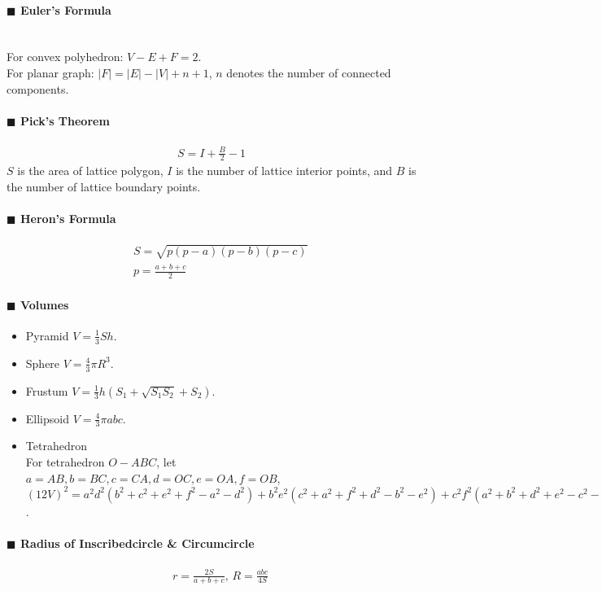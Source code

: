 \documentclass[10pt]{article}
\begin{document}
{\paragraph{$\blacksquare$ Euler's Formula}
\noindent \\
For convex polyhedron: $V-E+F=2$. \\
For planar graph: $|F|=|E|-|V|+n+1$, $n$ denotes the number of connected components.
\paragraph{$\blacksquare$ Pick's Theorem}
\begin{eqnarray*}
S=I+\frac{B}{2}-1
\end{eqnarray*}
$S$ is the area of lattice polygon, $I$ is the number of lattice interior points, and $B$ is the number of lattice boundary points.
\paragraph{$\blacksquare$ Heron's Formula}
\begin{eqnarray*}
&& S=\sqrt{p(p-a)(p-b)(p-c)} \\
&& p=\frac{a+b+c}{2}
\end{eqnarray*}
\paragraph{$\blacksquare$ Volumes}
\noindent
\begin{itemize}
\item Pyramid $V=\frac{1}{3}Sh$.
\item Sphere $V=\frac{4}{3}\pi R^3$.
\item Frustum $V=\frac{1}{3}h(S_1+\sqrt {S_1S_2}+S_2)$.
\item Ellipsoid $V=\frac{4}{3} \pi abc$.
\item Tetrahedron \\
For tetrahedron $O-ABC$, let $a=AB,b=BC,c=CA,d=OC,e=OA,f=OB$, ${(12V)}^2=a^2d^2(b^2+c^2+e^2+f^2-a^2-d^2)+b^2e^2(c^2+a^2+f^2+d^2-b^2-e^2)+c^2f^2(a^2+b^2+d^2+e^2-c^2-f^2)-a^2b^2c^2-a^2e^2f^2-d^2b^2f^2-d^2e^2c^2$.
\end{itemize}
\paragraph{$\blacksquare$ Radius of Inscribedcircle \& Circumcircle}
\begin{eqnarray*}
&& r=\frac{2S}{a+b+c},\, R=\frac{abc}{4S}
\end{eqnarray*}
}
\end{document}

